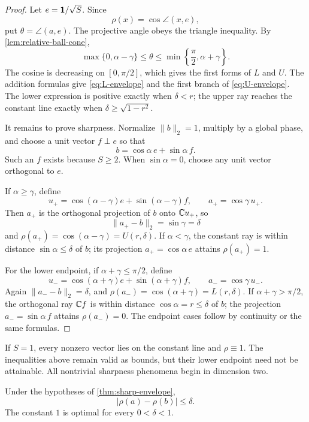 \begin{proof}
Let \(e=\mathbf 1/\sqrt S\).  Since
\[
 \rho(x)=\cos\angle(x,e),
\]
put \(\theta=\angle(a,e)\).  The projective angle obeys the triangle
inequality.  By \cref{lem:relative-ball-cone},
\[
 \max\{0,\alpha-\gamma\}
 \le\theta\le
 \min\left\{\frac{\pi}{2},\alpha+\gamma\right\}.
\]
The cosine is decreasing on \([0,\pi/2]\), which gives the first
forms of \(L\) and \(U\).  The addition formulas give
\eqref{eq:L-envelope} and the first branch of
\eqref{eq:U-envelope}.  The lower expression is positive exactly
when \(\delta<r\); the upper ray reaches the constant line exactly
when \(\delta\ge\sqrt{1-r^2}\).

It remains to prove sharpness.  Normalize \(\|b\|_2=1\), multiply
by a global phase, and choose a unit vector \(f\perp e\) so that
\[
 b=\cos\alpha\,e+\sin\alpha\,f.
\]
Such an \(f\) exists because \(S\ge2\).  When
\(\sin\alpha=0\), choose any unit vector orthogonal to \(e\).

If \(\alpha\ge\gamma\), define
\[
 u_+
 =
 \cos(\alpha-\gamma)e+\sin(\alpha-\gamma)f,
 \qquad
 a_+=\cos\gamma\,u_+.
\]
Then \(a_+\) is the orthogonal projection of \(b\) onto
\(\mathbb C u_+\), so
\[
 \|a_+-b\|_2=\sin\gamma=\delta
\]
and \(\rho(a_+)=\cos(\alpha-\gamma)=U(r,\delta)\).
If \(\alpha<\gamma\), the constant ray is within distance
\(\sin\alpha\le\delta\) of \(b\); its projection
\(a_+=\cos\alpha\,e\) attains \(\rho(a_+)=1\).

For the lower endpoint, if
\(\alpha+\gamma\le\pi/2\), define
\[
 u_-
 =
 \cos(\alpha+\gamma)e+\sin(\alpha+\gamma)f,
 \qquad
 a_-=\cos\gamma\,u_-.
\]
Again \(\|a_--b\|_2=\delta\), and
\(\rho(a_-)=\cos(\alpha+\gamma)=L(r,\delta)\).
If \(\alpha+\gamma>\pi/2\), the orthogonal ray \(\mathbb C f\) is within
distance \(\cos\alpha=r\le\delta\) of \(b\); the projection
\(a_-=\sin\alpha\,f\) attains \(\rho(a_-)=0\).
The endpoint cases follow by continuity or the same formulas.
\end{proof}

\begin{remark}
If \(S=1\), every nonzero vector lies on the constant line and
\(\rho\equiv1\).  The inequalities above remain valid as bounds,
but their lower endpoint need not be attainable.  All nontrivial
sharpness phenomena begin in dimension two.
\end{remark}

\begin{corollary}
\label{cor:optimal-additive-stability}
Under the hypotheses of \cref{thm:sharp-envelope},
\begin{equation}
 \boxed{
 |\rho(a)-\rho(b)|\le\delta.}
\label{eq:rho-one-lipschitz}
\end{equation}
The constant \(1\) is optimal for every \(0<\delta<1\).
\end{corollary}

